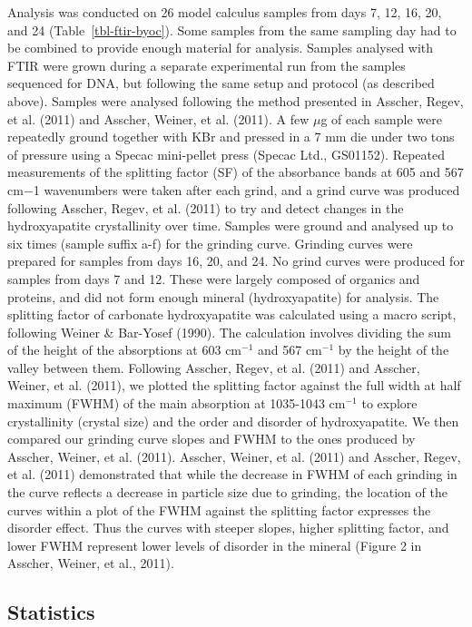 \documentclass[
]{article}
\begin{document}
Analysis was conducted on 26 model calculus samples from days 7, 12, 16,
20, and 24 (Table~\ref{tbl-ftir-byoc}). Some samples from the same
sampling day had to be combined to provide enough material for analysis.
Samples analysed with FTIR were grown during a separate experimental run
from the samples sequenced for DNA, but following the same setup and
protocol (as described above). Samples were analysed following the
method presented in Asscher, Regev, et al. (2011) and Asscher, Weiner,
et al. (2011). A few \(\mu\)g of each sample were repeatedly ground
together with KBr and pressed in a 7 mm die under two tons of pressure
using a Specac mini-pellet press (Specac Ltd., GS01152). Repeated
measurements of the splitting factor (SF) of the absorbance bands at 605
and 567 cm−1 wavenumbers were taken after each grind, and a grind curve
was produced following Asscher, Regev, et al. (2011) to try and detect
changes in the hydroxyapatite crystallinity over time. Samples were
ground and analysed up to six times (sample suffix a-f) for the grinding
curve. Grinding curves were prepared for samples from days 16, 20, and
24. No grind curves were produced for samples from days 7 and 12. These
were largely composed of organics and proteins, and did not form enough
mineral (hydroxyapatite) for analysis. The splitting factor of carbonate
hydroxyapatite was calculated using a macro script, following Weiner \&
Bar-Yosef (1990). The calculation involves dividing the sum of the
height of the absorptions at 603 cm\(^{-1}\) and 567 cm\(^{-1}\) by the
height of the valley between them. Following Asscher, Regev, et al.
(2011) and Asscher, Weiner, et al. (2011), we plotted the splitting
factor against the full width at half maximum (FWHM) of the main
absorption at 1035-1043 cm\(^{-1}\) to explore crystallinity (crystal
size) and the order and disorder of hydroxyapatite. We then compared our
grinding curve slopes and FWHM to the ones produced by Asscher, Weiner,
et al. (2011). Asscher, Weiner, et al. (2011) and Asscher, Regev, et al.
(2011) demonstrated that while the decrease in FWHM of each grinding in
the curve reflects a decrease in particle size due to grinding, the
location of the curves within a plot of the FWHM against the splitting
factor expresses the disorder effect. Thus the curves with steeper
slopes, higher splitting factor, and lower FWHM represent lower levels
of disorder in the mineral (Figure 2 in Asscher, Weiner, et al., 2011).

\hypertarget{statistics}{%
\subsection{Statistics}\label{statistics}}
\end{document}

